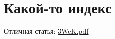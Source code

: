 
\title{}
\author{}
\date{01 May 2022}

\maketitle
\section{Какой-то индекс}
Отличная статья: \url{3WeK.pdf}
